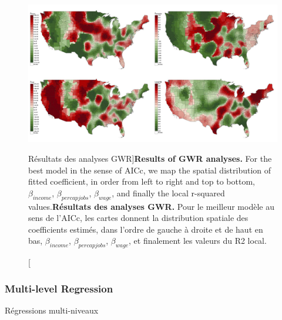 \begin{figure}
\includegraphics[width=\linewidth]{Figures/Final/8-2-2-fig-energyprice-gwr.jpg}
\caption[Results of GWR analyses][Résultats des analyses GWR]{\textbf{Results of GWR analyses.} For the best model in the sense of AICc, we map the spatial distribution of fitted coefficient, in order from left to right and top to bottom, $\beta_{income}$, $\beta_{percapjobs}$, $\beta_{wage}$, and finally the local r-squared values.\label{fig:energyprice:gwr}}{\textbf{Résultats des analyses GWR.} Pour le meilleur modèle au sens de l'AICc, les cartes donnent la distribution spatiale des coefficients estimés, dans l'ordre de gauche à droite et de haut en bas, $\beta_{income}$, $\beta_{percapjobs}$, $\beta_{wage}$, et finalement les valeurs du R2 local.\label{fig:energyprice:gwr}}
\end{figure}



\subsubsection{Multi-level Regression}{Régressions multi-niveaux}




